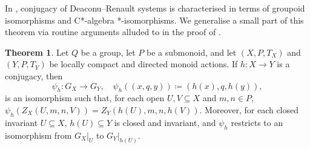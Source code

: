 \documentclass[11pt]{amsart}
\theoremstyle{definition}
\numberwithin{thm}{section}
\numberwithin{equation}{section}
\newtheorem{theorem}[thm]{Theorem}
\newcommand{\SDPG}[1]{G_{#1}}
\newcommand{\SDPGcylinder}[5]{Z_{#1}(#2,#3,#4,#5)}
\newcommand{\reduction}[2]{#1|_{#2}}
\begin{document}
In \cite[Theorem 3.1]{ABCE23}, conjugacy of Deaconu--Renault systems is characterised in terms of groupoid isomorphisms and C*-algebra *-isomorphisms.
We generalise a small part of this theorem via routine arguments alluded to in the proof of \cite[Proposition 3.8]{ABCE23}.

\begin{theorem}
\label{thm:conjugate_actions_have_isomorphic_groupoids}
Let $Q$ be a group, let $P$ be a submonoid, and let $(X, P, T_X)$ and $(Y, P, T_Y)$ be locally compact and directed monoid actions.
If $h \colon X \to Y$ is a conjugacy, then 
\[
\psi_h \colon \SDPG{X} \to \SDPG{Y}, \quad \psi_h((x, q, y)) 
\coloneqq (h(x), q, h(y)),
\]
is an isomorphism such that, for each open $U, V \subseteq X$ and $m, n \in P$, $\psi_h(\SDPGcylinder{X}{U}{m}{n}{V}) = \SDPGcylinder{Y}{h(U)}{m}{n}{h(V)}$.
Moreover, for each closed invariant $U \subseteq X$, $h(U) \subseteq Y$ is closed and invariant, and $\psi_h$ restricts to an isomorphism from $\reduction{\SDPG{X}}{U}$ to $\reduction{\SDPG{Y}}{h(U)}$.
\end{theorem}
\end{document}

